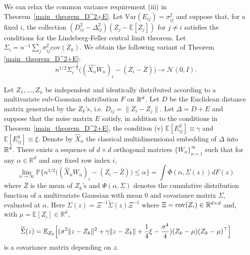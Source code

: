 \begin{remark} We can relax the common variance requirement (iii) in
Theorem~\ref{main_theorem_D^2+E}. Let $\textrm{Var}(E_{ij}) =
\sigma_{ij}^2$ and suppose that, for a fixed $i$, the collection $(D^{2}_{ij} -
\Delta^{2}_{ij})(Z_{j} - \mathbb{E}[Z_j])$ for $j \not = i$ satisfies the conditions for the
Lindeberg-Feller central limit theorem. Let $\Sigma_{i} = n^{-1}
\sum_{j} \sigma_{ij}^2 \mathrm{cov}(Z_k)$. We 
obtain the following variant of Theorem \ref{main_theorem_D^2+E}:
$$n^{1/2} \Sigma_{i}^{-\frac{1}{2}} \bigl((\hat{X_n}W_n)_i - (Z_i - \bar{Z})\bigr) \rightarrow \mathcal{N}(0, I).$$
\end{remark}

\begin{theorem}[Central Limit Theorem for $\Delta = D + E$]
\label{main_theorem_D+E}%
Let $Z_1, \dots, Z_n$ be independent and identically distributed
according to a multivariate sub-Gaussian distribution $F$ on ${\mathbb R}^d$. Let $D$ be the Euclidean
distance matrix generated by the $Z_k$'s, i.e. $D_{ij} = \|Z_i -
Z_j\|$. 
Let $\Delta = D + E$ and suppose that the noise matrix $E$ satisfy, in addition to the
conditions in Theorem~\ref{main_theorem_D^2+E}, the condition (v)
$\mathbb{E}[E_{ij}^3] \equiv \gamma$ and $\mathbb{E}[E_{ij}^4] \equiv
\xi$. Denote by $\hat{X}_n$ the classical multidimensional embedding of
$\Delta$ into ${\mathbb R}^d$. There exists a sequence of $d \times d$
orthogonal matrices $\{W_n\}_{n=1}^{\infty}$ such that for any $\alpha
\in \mathbb{R}^{d}$ and any fixed row index $i$,
  $$ \lim_{n {\to} \infty} \mathbb{P} \{n^{1/2} \bigl((\hat{X}_n W_n)_{i} - (Z_i - \bar{Z})\bigr) \leq \alpha\} = \int 
  \Phi(\alpha, \Sigma(z)) dF(z)$$
  where $\bar{Z}$ is the mean of $Z_k$'s and $\Phi(\alpha, \Sigma)$
  denotes the cumulative distribution function of a multivariate
  Gaussian with mean $0$ and covariance matrix $\Sigma$, 
evaluated at $\alpha$. Here $\Sigma (z)= {\Xi}^{-1}
\widetilde{\Sigma}(z) {\Xi}^{-1}$ where $\Xi =
\mathrm{cov}(Z_i) \in {\mathbb R}^{d \times d}$ and, 
with $\mu = \mathbb{E}[Z_i] \in \mathbb{R}^{d}$,
  $$\widetilde{\Sigma} (z) = \mathbb{E}_{Z_k}\Bigl[(\sigma^2
  \|z - Z_k\|^2 + \gamma \| z - Z_k \|+ \frac{1}{4} \xi -
  \frac{\sigma^4}{4}) (Z_k- {\mu}) (Z_k - {\mu})^\top\Bigr] $$  
is a covariance matrix depending on $\emph{z}$.
\end{theorem}



